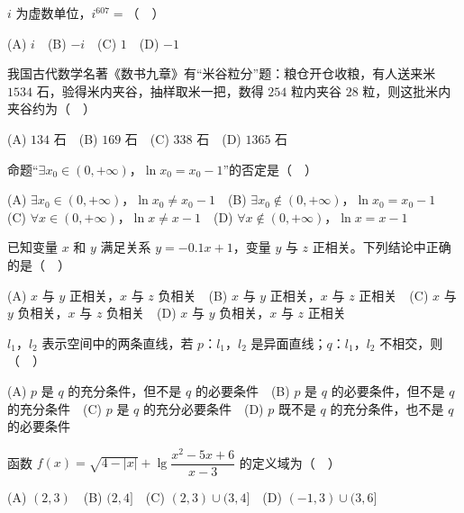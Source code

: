 

\begin{question}
\(i\) 为虚数单位，\(i^{607}=\)（　）

(A) \(i\)　(B) \(-i\)　(C) \(1\)　(D) \(-1\)

\end{question}
\begin{question}
我国古代数学名著《数书九章》有“米谷粒分”题：粮仓开仓收粮，有人送来米 \(1534\) 石，验得米内夹谷，抽样取米一把，数得 \(254\) 粒内夹谷 \(28\) 粒，则这批米内夹谷约为（　）

(A) \(134\) 石　(B) \(169\) 石　(C) \(338\) 石　(D) \(1365\) 石

\end{question}
\begin{question}
命题“\(\exists x_0\in(0,+\infty)\)，\(\ln x_0=x_0-1\)”的否定是（　）

(A) \(\exists x_0\in(0,+\infty)\)，\(\ln x_0\neq x_0-1\)　(B) \(\exists x_0\notin(0,+\infty)\)，\(\ln x_0=x_0-1\)　(C) \(\forall x\in(0,+\infty)\)，\(\ln x\neq x-1\)　(D) \(\forall x\notin(0,+\infty)\)，\(\ln x=x-1\)

\end{question}
\begin{question}
已知变量 \(x\) 和 \(y\) 满足关系 \(y=-0.1x+1\)，变量 \(y\) 与 \(z\) 正相关。下列结论中正确的是（　）

(A) \(x\) 与 \(y\) 正相关，\(x\) 与 \(z\) 负相关　(B) \(x\) 与 \(y\) 正相关，\(x\) 与 \(z\) 正相关　(C) \(x\) 与 \(y\) 负相关，\(x\) 与 \(z\) 负相关　(D) \(x\) 与 \(y\) 负相关，\(x\) 与 \(z\) 正相关

\end{question}
\begin{question}
\(l_1\)，\(l_2\) 表示空间中的两条直线，若 \(p\)：\(l_1\)，\(l_2\) 是异面直线；\(q\)：\(l_1\)，\(l_2\) 不相交，则（　）

(A) \(p\) 是 \(q\) 的充分条件，但不是 \(q\) 的必要条件　(B) \(p\) 是 \(q\) 的必要条件，但不是 \(q\) 的充分条件　(C) \(p\) 是 \(q\) 的充分必要条件　(D) \(p\) 既不是 \(q\) 的充分条件，也不是 \(q\) 的必要条件

\end{question}
\begin{question}
函数 \(f(x)=\sqrt{4-|x|}+\lg\dfrac{x^2-5x+6}{x-3}\) 的定义域为（　）

(A) \((2,3)\)　(B) \((2,4]\)　(C) \((2,3)\cup(3,4]\)　(D) \((-1,3)\cup(3,6]\)

\end{question}

